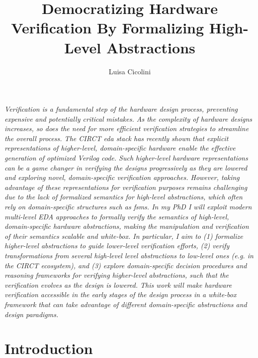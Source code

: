 \documentclass[sigconf,authorversion,nonacm, 11pt]{acmart}
\begin{document}
\title{Democratizing Hardware Verification By Formalizing High-Level Abstractions}

\author{Luisa Cicolini}

\maketitle
\thispagestyle{empty}

\textit{
    Verification is a fundamental step of the hardware design process, preventing expensive and potentially critical mistakes.
    As the complexity of hardware designs increases, so does the need for more efficient verification strategies to streamline the overall process.
    The CIRCT \ac{eda} stack has recently shown that explicit representations of higher-level, domain-specific hardware enable the effective generation of optimized Verilog code.
    Such higher-level hardware representations can be a game changer in verifying the designs progressively as they are lowered and exploring novel, domain-specific verification approaches. 
    However, taking advantage of these representations for verification purposes remains challenging due to the lack of formalized semantics for high-level abstractions, which often rely on domain-specific structures such as \acp{fsm}.
    In my PhD I will exploit modern multi-level EDA approaches to formally verify the semantics of high-level, domain-specific hardware abstractions, making the manipulation and verification of their semantics scalable and white-box.
    In particular, I aim to
    (1) formalize higher-level abstractions to guide lower-level verification efforts, 
    (2) verify transformations from several high-level level abstractions to low-level ones (e.g. in the CIRCT ecosystem), and
    (3) explore domain-specific decision procedures and reasoning frameworks for verifying higher-level abstractions, such that the verification evolves as the design is lowered. 
    This work will make hardware verification accessible in the early stages of the design process in a white-box framework that can take advantage of different domain-specific abstractions and design paradigms.
}   


\section{Introduction}
\end{document}
